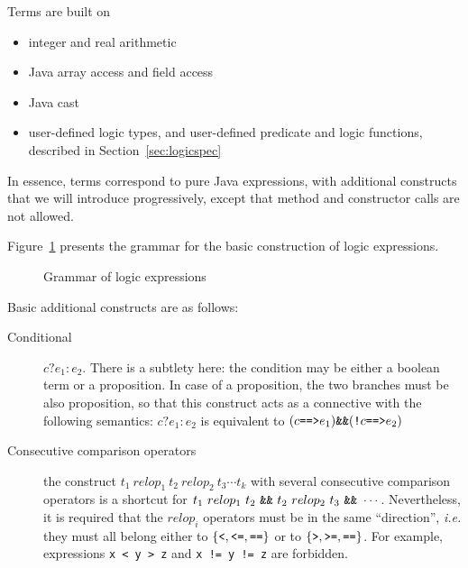 \documentclass[a4paper,11pt,twoside,openright]{report}
\begin{document}
Terms are built on 
\begin{itemize}
\item integer and real arithmetic
\item Java array access and field access
\item Java cast
\item user-defined logic types, and user-defined predicate and logic
  functions, described in Section~\ref{sec:logicspec}
\end{itemize}
In essence, terms correspond to pure Java expressions, with additional
constructs that we will introduce progressively, except that method
and constructor calls are not allowed.

Figure~\ref{fig:gram:lexpr} presents the grammar for the basic
construction of logic expressions.  

\begin{figure}[p]
  \caption{Grammar of logic expressions}
\label{fig:gram:lexpr}
\end{figure}

Basic additional constructs are as follows:
\begin{description}

\item[Conditional] $c ? e_1 : e_2$. There is a subtlety
  here: the condition may be either a boolean term or a proposition.  In
  case of a proposition, the two branches must be also proposition, so
  that this construct acts as a connective with the following
  semantics: $ c ? e_1 : e_2$ is equivalent to $(c
  \verb|==>| e_1) \verb|&&| (\verb|!| c \verb|==>| e_2)$


\item[Consecutive comparison operators] the construct $t_1~relop_1~t_2~relop_2~t_3 \cdots t_k$ with
  several consecutive comparison operators is a shortcut for
  $t_1~relop_1~t_2 ~\verb|&&|~ t_2~relop_2~t_3 ~\verb|&&|~ \cdots $.
  Nevertheless, it is required that the $relop_i$ operators must be in
  the same ``direction'', \emph{i.e.} they must all belong either to
  $\{\verb|<|, \verb|<=|, \verb|==|\}$ or to
  $\{\verb|>|,\verb|>=|,\verb|==|\}$. For example, expressions
  \verb|x < y > z| and \verb|x != y != z| are forbidden.

\end{description}
\end{document}
